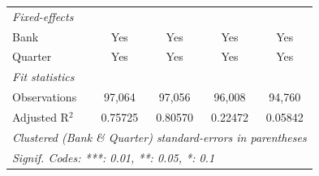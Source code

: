 \begin{tabular}{lcccc}
   \midrule
   \emph{Fixed-effects}\\
   Bank                           & Yes                             & Yes                          & Yes               & Yes\\  
   Quarter                        & Yes                             & Yes                          & Yes               & Yes\\  
   \midrule
   \emph{Fit statistics}\\
   Observations                   & 97,064                          & 97,056                       & 96,008            & 94,760\\  
   Adjusted R$^2$                 & 0.75725                         & 0.80570                      & 0.22472           & 0.05842\\  
   \midrule \midrule
   \multicolumn{5}{l}{\emph{Clustered (Bank \& Quarter) standard-errors in parentheses}}\\
   \multicolumn{5}{l}{\emph{Signif. Codes: ***: 0.01, **: 0.05, *: 0.1}}\\
\end{tabular}
\par\endgroup


